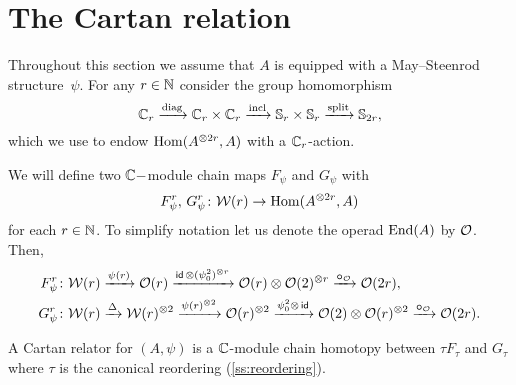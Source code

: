 
\section{The Cartan relation}\label{s:cartan}

Throughout this section we assume that $A$ is equipped with a May--Steenrod structure~$\psi$.
For any $r \in \mathbb{N}$ consider the group homomorphism
\begin{equation}\label{eq:cyclic to 2-symetric}
	\mathbb{C}_r \xrightarrow{\mathrm{diag}} \mathbb{C}_r \times \mathbb{C}_r \xrightarrow{\mathrm{incl}} \mathbb{S}_r \times \mathbb{S}_r \xrightarrow{\mathrm{split}} \mathbb{S}_{2r},
\end{equation}
which we use to endow $\mathrm{Hom}(A^{\otimes 2r}, A)$ with a $\mathbb{C}_r$-action.

We will define two $\mathbb{C}-$module chain maps $F_\psi$ and $G_\psi$ with
\[
F_\psi^r,\, G_\psi^r \colon \mathcal{W}(r) \to \mathrm{Hom}(A^{\otimes 2r}, A)
\]
for each $r \in \mathbb{N}$.
To simplify notation let us denote the operad $\mathrm{End}(A)$ by $\mathcal{O}$.
Then,
\begin{align*}
	F_\psi^r \colon& \mathcal{W}(r) \xrightarrow{\psi(r)} \mathcal{O}(r) \xrightarrow{\mathsf{id}\, \otimes (\psi_0^2)^{\otimes r}}
	\mathcal{O}(r) \otimes \mathcal{O}(2)^{\otimes r} \xrightarrow{\bm{\circ}_{\mathcal{O}}}
	\mathcal{O}(2r), \\
	G_\psi^r \colon& \mathcal{W}(r) \xrightarrow{\Delta}
	\mathcal{W}(r)^{\otimes 2} \xrightarrow{\psi(r)^{\otimes 2}}
	\mathcal{O}(r)^{\otimes 2} \xrightarrow{\psi_0^2 \otimes\, \mathsf{id}}
	\mathcal{O}(2) \otimes \mathcal{O}(r)^{\otimes 2} \xrightarrow{\bm{\circ}_{\mathcal{O}}}
	\mathcal{O}(2r).
\end{align*}

\begin{definition}
	A Cartan relator for $(A, \psi)$ is a $\mathbb{C}$-module chain homotopy between $\tau F_\tau$ and $G_\tau$ where $\tau$ is the canonical reordering (\cref{ss:reordering}).
\end{definition}

